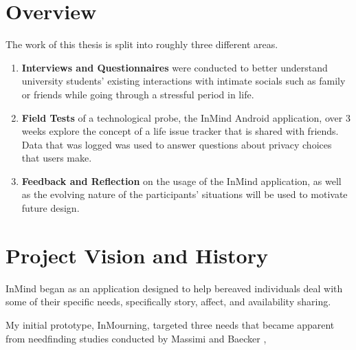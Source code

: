 \section{Overview}
  The work of this thesis is split into roughly three different areas.
  \begin{enumerate}
  \item \textbf{Interviews and Questionnaires} were conducted to better understand
    university students' existing interactions with intimate socials
    such as family or friends while going through a stressful period in life.
  \item \textbf{Field Tests} of a technological probe, the InMind Android application,
    over 3 weeks
    explore the concept of a life issue tracker that is shared with friends.
    Data that was logged was used to answer questions about privacy choices that users make.
  \item \textbf{Feedback and Reflection} on the usage of the InMind application,
    as well as the evolving nature of the participants' situations will
    be used to motivate future design.
  \end{enumerate}

\section{Project Vision and History}
\label{sec:vision}
  InMind began as an application designed to help bereaved individuals deal with
  some of their specific needs, specifically story, affect, and availability sharing.

  My initial prototype, InMourning, targeted three needs that became apparent
  from needfinding studies conducted by Massimi and
  Baecker \cite{mm11a, mm10, mm13},

